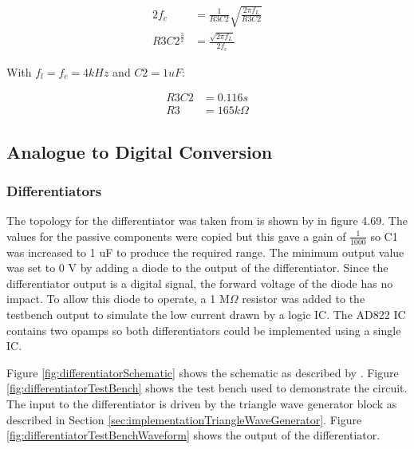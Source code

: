 \begin{equation}
    \begin{split}
        2f_{c} &= \frac{1}{R3C2}\sqrt{\frac{2\pi f_{L}}{R3C2}}\\
        R3C2^{\frac{3}{2}} &= \frac{\sqrt{2\pi f_{L}}}{2f_{c}}
    \end{split}
    \label{eqn:pllBandwidth}
\end{equation}

With $f_{l} = f_{c} = 4 kHz$ and $C2 = 1 uF$:

\begin{equation*}
    \begin{split}
        R3C2 &= 0.116s\\
        R3 &= 165 k\Omega
    \end{split}
\end{equation*}

\subsection{Analogue to Digital Conversion}

\subsubsection{Differentiators}
The topology for the differentiator was taken from  is shown by \citeauthor{DifferentiatorTopology} in figure 4.69\cite{DifferentiatorTopology}.
The values for the passive components were copied but this gave a gain of $\frac{1}{1000}$ so C1 was increased to 1 uF to produce the required range. 
The minimum output value was set to 0 V by adding a diode to the output of the differentiator. 
Since the differentiator output is a digital signal, the forward voltage of the diode has no impact.
To allow this diode to operate, a 1 M$\Omega$ resistor was added to the testbench output to simulate the low current drawn by a logic IC. 
The AD822 IC contains two opamps so both differentiators could be implemented using a single IC.

Figure \ref{fig:differentiatorSchematic} shows the schematic as described by \citeauthor{DifferentiatorTopology}\cite{DifferentiatorTopology}.
Figure \ref{fig:differentiatorTestBench} shows the test bench used to demonstrate the circuit. 
The input to the differentiator is driven by the triangle wave generator block as described in Section \ref{sec:implementationTriangleWaveGenerator}.
Figure \ref{fig:differentiatorTestBenchWaveform} shows the output of the differentiator. 


